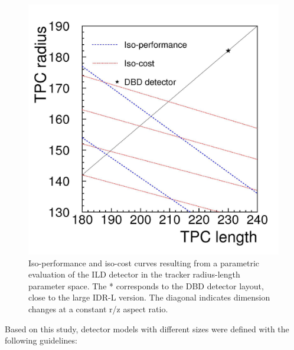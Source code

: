 \begin{figure}[t!]
\centering
\includegraphics[width=0.6\hsize]{ILD/fig/aspect_ratio.jpg}
\caption{Iso-performance and iso-cost curves resulting from a parametric evaluation of the ILD detector in the tracker radius-length parameter space. The * corresponds to the DBD detector layout, close to the large IDR-L version. The diagonal indicates dimension changes at a constant r/z aspect ratio.}
\label{fig:ILD:aspect_ratio}
\end{figure}

Based on this study, detector models with different sizes were defined with the following guidelines:

